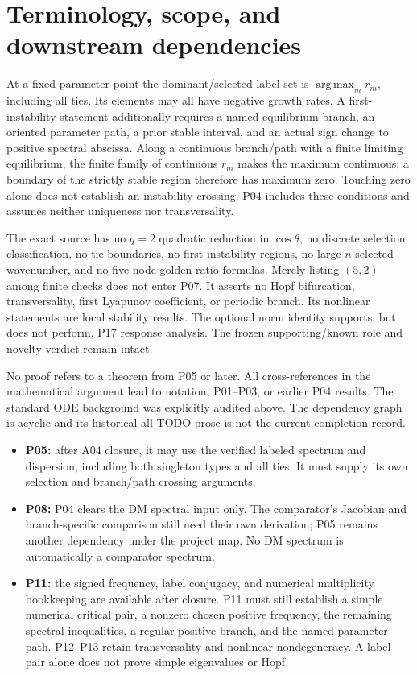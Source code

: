 \documentclass[11pt]{article}
\begin{document}
\section{Terminology, scope, and downstream dependencies}
At a fixed parameter point the dominant/selected-label set is
$\operatorname*{arg\,max}_m r_m$, including all ties. Its elements may all
have negative growth rates. A first-instability statement additionally
requires a named equilibrium branch, an oriented parameter path, a prior
stable interval, and an actual sign change to positive spectral abscissa.
Along a continuous branch/path with a finite limiting equilibrium, the
finite family of continuous $r_m$ makes the maximum continuous; a boundary
of the strictly stable region therefore has maximum zero. Touching zero
alone does not establish an instability crossing. P04 includes these
conditions and assumes neither uniqueness nor transversality.

The exact source has no $q=2$ quadratic reduction in $\cos\theta$, no
discrete selection classification, no tie boundaries, no first-instability
regions, no large-$n$ selected wavenumber, and no five-node golden-ratio
formulas. Merely listing $(5,2)$ among finite checks does not enter P07.
It asserts no Hopf bifurcation, transversality, first Lyapunov coefficient,
or periodic branch. Its nonlinear statements are local stability results.
The optional norm identity supports, but does not perform, P17 response
analysis. The frozen supporting/known role and novelty verdict remain intact.

No proof refers to a theorem from P05 or later. All cross-references in
the mathematical argument lead to notation, P01--P03, or earlier P04
results. The standard ODE background was explicitly audited above.
The dependency graph is acyclic and its historical all-TODO prose is not
the current completion record.

\begin{itemize}
\item \textbf{P05:} after A04 closure, it may use the verified labeled
spectrum and dispersion, including both singleton types and all ties.
It must supply its own selection and branch/path crossing arguments.
\item \textbf{P08:} P04 clears the DM spectral input only. The comparator's
Jacobian and branch-specific comparison still need their own derivation;
P05 remains another dependency under the project map. No DM spectrum is
automatically a comparator spectrum.
\item \textbf{P11:} the signed frequency, label conjugacy, and numerical
multiplicity bookkeeping are available after closure. P11 must still
establish a simple numerical critical pair, a nonzero chosen positive
frequency, the remaining spectral inequalities, a regular positive branch,
and the named parameter path. P12--P13 retain transversality and nonlinear
nondegeneracy. A label pair alone does not prove simple eigenvalues or Hopf.
\end{itemize}
\end{document}
